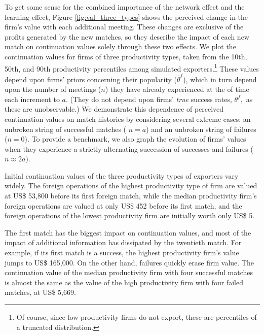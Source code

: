 \documentclass[12pt]{article}
\begin{document}
To get some sense for the combined importance of the network effect and the
learning effect, Figure \ref{fig:val_three_types} shows the perceived change
in the firm's value with each additional meeting. These changes are
exclusive of the profits generated by the new matches, so they describe the
impact of each new match on continuation values solely through these two
effects. We plot the continuation values for firms of three productivity
types, taken from the 10th, 50th, and 90th productivity percentiles among
simulated exporters.\footnote{%
Of course, since low-productivity firms do not export, these are percentiles
of a truncated distribution.} These values depend upon firms' priors
concerning their popularity ($\bar{\theta}^{f}$), which in turn depend upon
the number of meetings ($n$) they have already experienced at the of time
each increment to $a$. (They do not depend upon firms' \textit{true} success
rates, $\theta ^{f},$ as these are unobservable.) We demonstrate this
dependence of perceived continuation values on match histories by
considering several extreme cases: an unbroken string of successful matches (%
$n=a$) and an unbroken string of failures ($n=0$). To provide a benchmark,
we also graph the evolution of firms' values when they experience a strictly
alternating succession of successes and failures ($n\approx 2a)$.

Initial continuation values of the three productivity types of exporters
vary widely. The foreign operations of the highest productivity type of firm
are valued at US\$ 53,800 before its first foreign match, while the median
productivity firm's foreign operations are valued at only US\$ 452 before
its first match, and the foreign operations of the lowest productivity firm
are initially worth only US\$ 5.

The first match has the biggest impact on continuation values, and most of
the impact of additional information has dissipated by the twentieth match.
For example, if its first match is a success, the highest productivity
firm's value jumps to US\$ 165,000. On the other hand, failures quickly
erase firm value. The continuation value of the median productivity firm
with four successful matches is almost the same as the value of the high
productivity firm with four failed matches, at US\$ 5,669.

\end{document}
